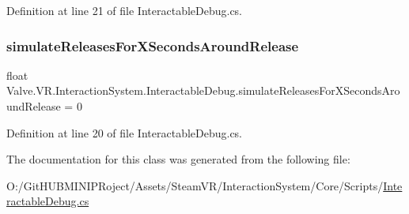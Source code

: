 Definition at line 21 of file Interactable\+Debug.\+cs.

\mbox{\label{class_valve_1_1_v_r_1_1_interaction_system_1_1_interactable_debug_ab40b057c60b5c91520e3273e17c1732d}} 
\subsubsection{\texorpdfstring{simulateReleasesForXSecondsAroundRelease}{simulateReleasesForXSecondsAroundRelease}}
{\footnotesize\ttfamily float Valve.\+V\+R.\+Interaction\+System.\+Interactable\+Debug.\+simulate\+Releases\+For\+X\+Seconds\+Around\+Release = 0}



Definition at line 20 of file Interactable\+Debug.\+cs.



The documentation for this class was generated from the following file\+:\begin{DoxyCompactItemize}
\item 
O\+:/\+Git\+H\+U\+B\+M\+I\+N\+I\+P\+Roject/\+Assets/\+Steam\+V\+R/\+Interaction\+System/\+Core/\+Scripts/\mbox{\hyperlink{_interactable_debug_8cs}{Interactable\+Debug.\+cs}}\end{DoxyCompactItemize}
